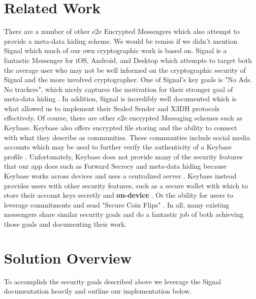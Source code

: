\documentclass[conference]{IEEEtran}
\begin{document}
\section{Related Work}
There are a number of other e2e Encrypted Messengers which also attempt to provide a meta-data hiding scheme. We would be remiss if we didn't mention Signal which much of our own cryptographic work is based on. Signal is a fantastic Messenger for iOS, Android, and Desktop which attempts to target both the average user who may not be well informed on the cryptographic security of Signal and the more involved cryptographer. One of Signal's key goals is "No Ads. No trackers",  which nicely captures the motivation for their stronger goal of meta-data hiding \cite{https://signal.org/signal}. In addition, Signal is incredibly well documented which is what allowed us to implement their Sealed Sender and X3DH protocols effectively. Of course, there are other e2e encrypted Messaging schemes such as Keybase. Keybase also offers encrypted file storing and the ability to connect with what they describe as communities. These communities include social media accounts which may be used to further verify the authenticity of a Keybase profile \cite{https://keybase.io/}. Unfortunately, Keybase does not provide many of the security features that our app does such as Forward Secrecy and meta-data hiding because Keybase works across devices and uses a centralized server \cite{https://book.keybase.io/docs/wallet}. Keybase instead provides users with other security features, such as a secure wallet with which to store their account keys secretly and \textbf{on-device} \cite{https://book.keybase.io/docs/wallet}.  Or the ability for users to leverage commitments and send "Secure Coin Flips" \cite{https://book.keybase.io/docs/wallet}. In all, many existing messengers share similar security goals and do a fantastic job of both achieving those goals and documenting their work.

\section{Solution Overview}
To accomplish the security goals described above we leverage the Signal documentation heavily and outline our implementation below. 
\end{document}
